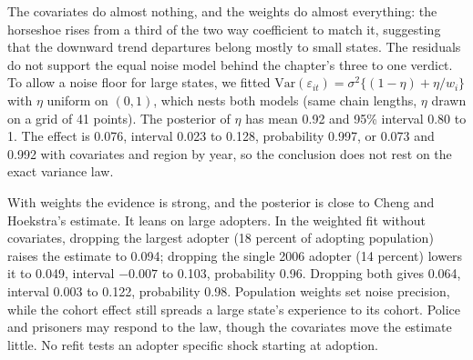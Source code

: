 The covariates do almost nothing, and the weights do almost everything: the horseshoe rises from a third of the two way coefficient to match it, suggesting that the downward trend departures belong mostly to small states. The residuals do not support the equal noise model behind the chapter's three to one verdict. To allow a noise floor for large states, we fitted $\mathrm{Var}(\varepsilon_{it}) = \sigma^2\{(1 - \eta) + \eta/w_i\}$ with $\eta$ uniform on $(0, 1)$, which nests both models (same chain lengths, $\eta$ drawn on a grid of 41 points). The posterior of $\eta$ has mean 0.92 and 95\% interval 0.80 to 1. The effect is 0.076, interval 0.023 to 0.128, probability 0.997, or 0.073 and 0.992 with covariates and region by year, so the conclusion does not rest on the exact variance law.

With weights the evidence is strong, and the posterior is close to Cheng and Hoekstra's estimate. It leans on large adopters. In the weighted fit without covariates, dropping the largest adopter (18 percent of adopting population) raises the estimate to 0.094; dropping the single 2006 adopter (14 percent) lowers it to 0.049, interval $-0.007$ to 0.103, probability 0.96. Dropping both gives 0.064, interval 0.003 to 0.122, probability 0.98. Population weights set noise precision, while the cohort effect still spreads a large state's experience to its cohort. Police and prisoners may respond to the law, though the covariates move the estimate little. No refit tests an adopter specific shock starting at adoption.

